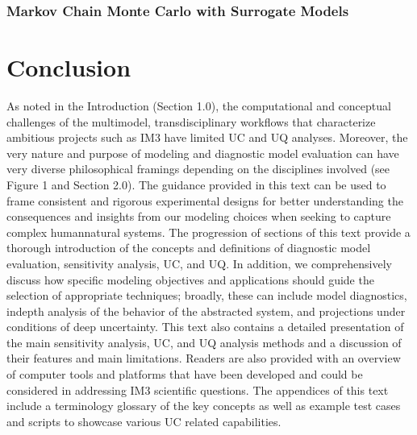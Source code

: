 \documentclass[letterpaper,10pt,english]{sphinxmanual}
\begin{document}
\subsection{Markov Chain Monte Carlo with Surrogate Models}
\label{\detokenize{6_uncertainty_quantification_a_tool_for_capturing_risks_and_extremes:markov-chain-monte-carlo-with-surrogate-models}}

\chapter{Conclusion}
\label{\detokenize{7_conclusion:conclusion}}\label{\detokenize{7_conclusion::doc}}
\sphinxAtStartPar
As noted in the Introduction (Section 1.0), the computational and conceptual challenges of the multi\sphinxhyphen{}model, transdisciplinary workflows that characterize ambitious projects such as IM3 have limited UC and UQ analyses. Moreover, the very nature and purpose of modeling and diagnostic model evaluation can have very diverse philosophical framings depending on the disciplines involved (see Figure 1 and Section 2.0). The guidance provided in this text  can be used to frame consistent and rigorous experimental designs for better understanding the consequences and insights from our modeling choices when seeking to capture complex human\sphinxhyphen{}natural systems. The progression of sections of this text provide a thorough introduction of the concepts and definitions of diagnostic model evaluation, sensitivity analysis, UC, and UQ. In addition, we comprehensively discuss how specific modeling objectives and applications should guide the selection of appropriate techniques; broadly, these can include model diagnostics, in\sphinxhyphen{}depth analysis of the behavior of the abstracted system, and projections under conditions of deep uncertainty. This text also contains a detailed presentation of the main sensitivity analysis, UC, and UQ analysis methods and a discussion of their features and main limitations. Readers are also provided with an overview of computer tools and platforms that have been developed and could be considered in addressing IM3 scientific questions. The appendices of this text include a terminology glossary of the key concepts as well as example test cases and scripts to showcase various UC related capabilities.
\end{document}
